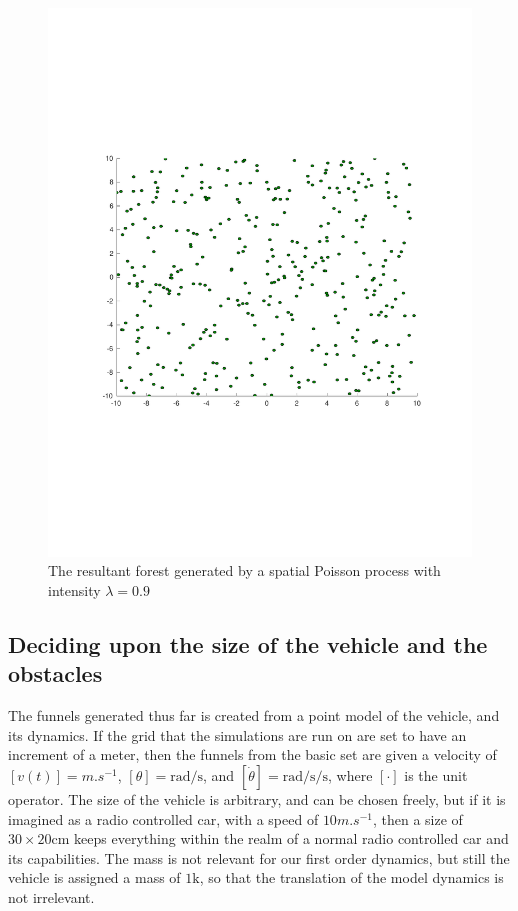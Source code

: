 \begin{figure}
\begin{minipage}[b]{0.4\textwidth}
    \includegraphics[width=\textwidth]{figures/experiments/poisson09}
    \caption{The resultant forest generated by a spatial Poisson process with
      intensity \(\lambda = 0.9\)}
    \label{fig:poisson09}
  \end{minipage}
\end{figure}

\subsection{Deciding upon the size of the vehicle and the obstacles}

The funnels generated thus far is created from a point model of the vehicle, and
its dynamics. If the grid that the simulations are run on are set to have an
increment of a meter, then the funnels from the basic set are given a velocity
of \([v(t)] = \si{m.s^{-1}}\), \([\theta] = \si{\radian\per\second}\), and
\([\dot{\theta}] = \si{\radian\per\second\per\second}\), where \([\cdot]\) is
the unit operator. The size of the vehicle is arbitrary, and can be chosen
freely, but if it is imagined as a radio controlled car, with a speed of
\(10\si{m.s^{-1}}\), then a size of \(30 \times 20 \si{\centi\metre} \) keeps
everything within the realm of a normal radio controlled car and its
capabilities. The mass is not relevant for our first order dynamics, but still
the vehicle is assigned a mass of \(1 \si{\kilo}\), so that the translation of
the model dynamics is not irrelevant.

